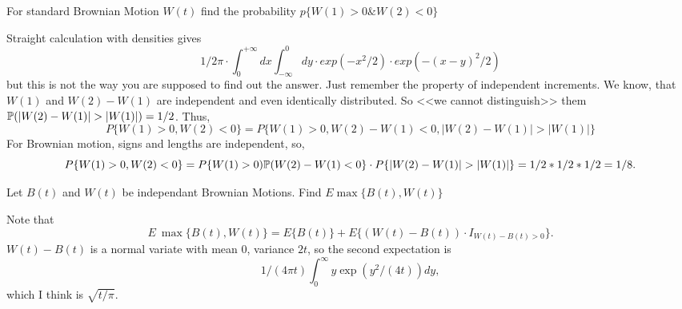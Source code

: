 \begin{problem}
For standard Brownian Motion $W(t)$ find the probability $p \{ W(1)>0 \& W(2)<0 \}$ 

\end{problem} 
\begin{solution} 
Straight calculation with densities gives
$$
  1/2\pi \cdot \int_0^{+\infty}{dx} \int_{-\infty}^0 dy \cdot exp(-x^2/2) \cdot exp(-(x-y)^2/2)
$$
but this is not the way you are supposed to find out the answer.
Just remember the property of independent increments.
We know, that $W(1)$ and $W(2)-W(1)$ are independent and even identically distributed. 
So <<we cannot distinguish>>  them $\P( |W(2)-W(1)| > |W(1)| ) = 1/2$. Thus, 
$$
  P\{ W(1)>0, W(2)<0 \} = P\{ W(1)>0, W(2)-W(1) < 0, |W(2)-W(1)| > |W(1)| \}
$$
For Brownian motion, signs and lengths are independent, so,
$$
  P\{ W(1)>0, W(2)<0 \} = P\{ W(1)>0) \P(W(2)-W(1) < 0\} \cdot P\{|W(2)-W(1)| > |W(1)|\} = 1/2*1/2*1/2=1/8.
$$ 
\end{solution}

\begin{problem}
Let $B(t)$ and $W(t)$ be independant Brownian Motions. Find $E\max\{B(t),W(t)\}$ 

\end{problem} 
\begin{solution} 
Note that
$$
  E\ \max\{B(t),W(t)\} =  E \{B(t)\} + E\{(W(t) - B(t))\cdot I_{W(t) - B(t) >0}\}.
$$
$W(t) - B(t)$ is a normal variate with mean $0$, variance $2t$, so the second expectation is 
$$
  1/(4\pi t)\int_0^\infty y \exp(y^2/(4t))dy,
$$ 
which I think is $\sqrt{t/\pi}$. 
\end{solution}

